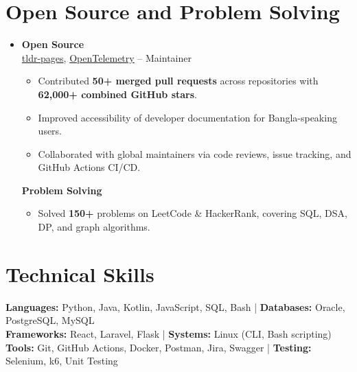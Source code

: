 \documentclass[a4paper]{article}
\newcommand{\subheading}[1]{\noindent \textbf{#1} \\}
\begin{document}
\section{Open Source and Problem Solving}
\begin{itemize}[leftmargin=0.15in, label={}, parsep=0pt]
\item
\small
\subheading{Open Source}
\href{https://github.com/tldr-pages/tldr}{tldr-pages}, \href{https://github.com/open-telemetry}{OpenTelemetry} --
Maintainer
\begin{itemize}[noitemsep, topsep=0pt]
    \item Contributed \textbf{50+ merged pull requests} across repositories with \textbf{62,000+ combined GitHub stars}.
    \item Improved accessibility of developer documentation for Bangla-speaking users.
    \item Collaborated with global maintainers via code reviews, issue tracking, and GitHub Actions CI/CD.
\end{itemize}

\vspace{0.5em}

\subheading{Problem Solving}
\begin{itemize}[noitemsep, topsep=0pt, partopsep=0pt]
\item Solved \textbf{150+} problems on LeetCode \& HackerRank, covering SQL, DSA, DP, and graph algorithms.
\end{itemize}
\end{itemize}




\section{Technical Skills}
\begin{itemize}[leftmargin=0.15in, label={}]
\small{\item{
\textbf{Languages:} Python, Java, Kotlin, JavaScript, SQL, Bash \;|\;
\textbf{Databases:} Oracle, PostgreSQL, MySQL\\
\textbf{Frameworks:} React, Laravel, Flask \;|\;
\textbf{Systems:} Linux (CLI, Bash scripting)\\
\textbf{Tools:} Git, GitHub Actions, Docker, Postman, Jira, Swagger \;|\;
\textbf{Testing:} Selenium, k6, Unit Testing
}}
\end{itemize}




\end{document}
